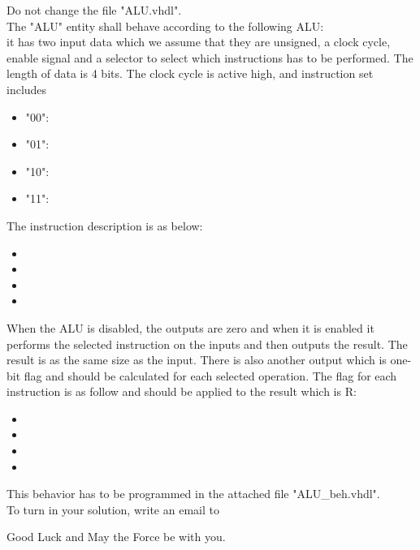 \documentclass[a4paper,12pt]{article}
\begin{document}
Do not change the file "ALU.vhdl".
\\

The "ALU" entity shall behave according to the following ALU:
\\
it has two input data which we assume that they are unsigned, a clock cycle, enable signal and a selector to select which instructions has to be performed. The length of data is 4 bits. The clock cycle is active high, and instruction set includes %
\\
\begin{itemize}
\item "00": %
\item "01": %
\item "10": %
\item "11": %
\end{itemize}
\vspace{0.3cm}

The instruction description is as below:
\begin{itemize}
\item %
\item %
\item %
\item %
\end{itemize}
\vspace{0.3cm}

When the ALU is disabled, the outputs are zero and when it is enabled it performs the selected instruction on the inputs and then outputs the result. The result is as the same size as the input. There is also another output which is one-bit flag and should be calculated for each selected operation. The flag for each instruction is as follow and should be applied to the result which is R:
\begin{itemize}
\item %
\item %
\item %
\item %
\end{itemize}
\vspace{0.3cm}

This behavior has to be programmed in the attached file "ALU\_beh.vhdl". 
\\

To turn in your solution, write an email to %

\vspace{0.7cm}

Good Luck and May the Force be with you.
\end{document}
